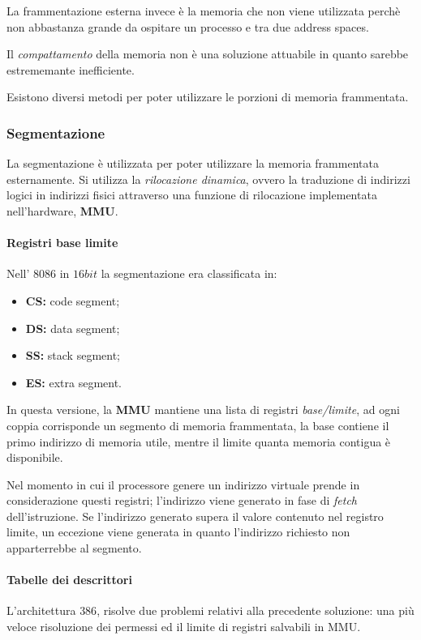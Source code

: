 La frammentazione esterna invece è la memoria che non viene utilizzata perchè
non abbastanza grande da ospitare un processo e tra due address spaces.

Il \textit{compattamento} della memoria non è una soluzione attuabile in quanto
sarebbe estrememante inefficiente.

Esistono diversi metodi per poter utilizzare le porzioni di memoria
frammentata.

\subsubsection{Segmentazione}
La segmentazione è utilizzata per poter utilizzare la memoria frammentata
esternamente.
Si utilizza la \textit{rilocazione dinamica}, ovvero la traduzione di indirizzi
logici in indirizzi fisici attraverso una funzione di rilocazione implementata
nell'hardware, \textbf{MMU}.


\paragraph{Registri base limite}
Nell' $8086$ in $16bit$ la segmentazione era classificata in:
\begin{itemize}
  \item \textbf{CS:} code segment;
  \item \textbf{DS:} data segment;
  \item \textbf{SS:} stack segment;
  \item \textbf{ES:} extra segment.
\end{itemize}

In questa versione, la \textbf{MMU} mantiene una lista di registri \textit{
base/limite}, ad ogni coppia corrisponde un segmento di memoria frammentata,
la base contiene il primo indirizzo di memoria utile, mentre il limite quanta
memoria contigua è disponibile.

Nel momento in cui il processore genere un indirizzo virtuale prende in
considerazione questi registri; l'indirizzo viene generato in fase di \textit{
fetch} dell'istruzione.
Se l'indirizzo generato supera il valore contenuto nel registro limite, un
eccezione viene generata in quanto l'indirizzo richiesto non apparterrebbe al
segmento.

\paragraph{Tabelle dei descrittori}
L'architettura $386$, risolve due problemi relativi alla precedente soluzione:
una più veloce risoluzione dei permessi ed il limite di registri salvabili
in MMU.


